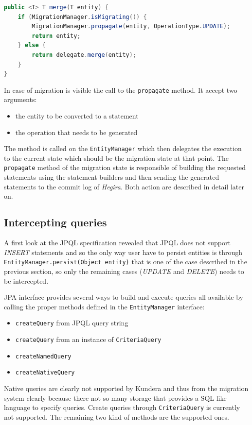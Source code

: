 \begin{lstlisting}[language=Java, caption=Integrate migration logic, label=code:isMigrating]
public <T> T merge(T entity) {
    if (MigrationManager.isMigrating()) {
        MigrationManager.propagate(entity, OperationType.UPDATE);
        return entity;
    } else {
        return delegate.merge(entity);
    }
}
\end{lstlisting}

\noindent In case of migration is visible the call to the \texttt{propagate} method. It accept two arguments:
\begin{itemize}
\item the entity to be converted to a statement
\item the operation that needs to be generated
\end{itemize}
The method is called on the \texttt{EntityManager} which then delegates the execution to the current state which should be the migration state at that point. The \texttt{propagate} method of the migration state is responsible of building the requested statements using the statement builders and then sending the generated statements to the commit log of \textit{Hegira}. Both action are described in detail later on.

\subsection{Intercepting queries}
A first look at the JPQL specification \cite{book:projpa2} revealed that JPQL does not support \textit{INSERT} statements and so the only way user have to persist entities is through \texttt{EntityManager.persist(Object entity)} that is one of the case described in the previous section, so only the remaining cases (\textit{UPDATE} and \textit{DELETE}) needs to be intercepted.

\noindent JPA interface provides several ways to build and execute queries all available by calling the proper methods defined in the \texttt{EntityManager} interface: 
\begin{itemize}
\item \texttt{createQuery} from JPQL query string
\item \texttt{createQuery} from an instance of \texttt{CriteriaQuery}
\item \texttt{createNamedQuery}
\item \texttt{createNativeQuery}
\end{itemize}
 
\noindent Native queries are clearly not supported by Kundera and thus from the migration system clearly because there not so many storage that provides a SQL-like language to specify queries.
Create queries through \texttt{CriteriaQuery} is currently not supported.
The remaining two kind of methods are the supported ones.

